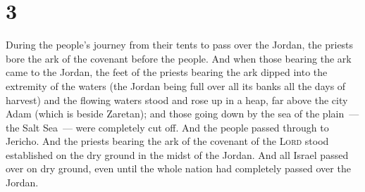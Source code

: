 \section{3}\label{Joshua 3}
\begin{enumerate}[align=center]
     During the people's journey from their tents to pass over the Jordan, the priests bore the ark of the covenant before the people.%
     And when those bearing the ark came to the Jordan, the feet of the priests bearing the ark dipped into the extremity of the waters (the Jordan being full over all its banks all the days of harvest)%
     and the flowing waters stood and rose up in a heap, far above the city Adam (which is beside Zaretan); and those going down by the sea of the plain~--- the Salt Sea~--- were completely cut off. And the people passed through to Jericho.%
     And the priests bearing the ark of the covenant of the \textsc{Lord} stood established on the dry ground in the midst of the Jordan. And all Israel passed over on dry ground, even until the whole nation had completely passed over the Jordan.%
\end{enumerate}
